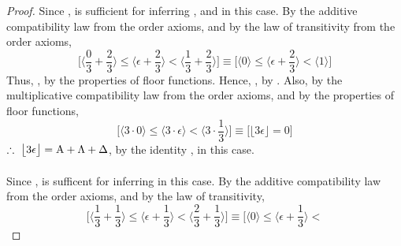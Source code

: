 \documentclass[preview]{standalone}
\begin{document}
\begin{proof}
    Since , 
    \bm{$\Delta$} is sufficient for inferring , 
    and \bm{$\Lambda$} in this case.
    By the additive compatibility law from the order axioms, 
    and by the law of transitivity from the order axioms,
    \begin{equation*}
        \bigg[
            \bigg \langle \frac{0}{3} + \frac{2}{3} \bigg \rangle
                \leq 
            \bigg \langle \epsilon + \frac{2}{3} \bigg \rangle 
                < 
            \bigg \langle \frac{1}{3} + \frac{2}{3} \bigg \rangle
        \bigg]
            \equiv
        \bigg[
            \bigg \langle 0 \bigg \rangle
                \leq 
            \bigg \langle \epsilon + \frac{2}{3} \bigg \rangle 
                < 
            \bigg \langle 1 \bigg \rangle
        \bigg]
    \end{equation*}
    Thus, , by the properties of floor functions. 
    Hence, , by . 
    Also, by the multiplicative compatibility law from the order axioms,
    and by the properties of floor functions,
    \begin{equation*}
        \bigg[
            \bigg \langle 3 \cdot 0 \bigg \rangle
                \leq
            \bigg \langle 3 \cdot \epsilon \bigg \rangle
                <
            \bigg \langle 3 \cdot \frac{1}{3} \bigg \rangle
        \bigg]
            \equiv
        \bigg[
            \big \lfloor 3 \epsilon \big \rfloor
                =
            0
        \bigg]
    \end{equation*}
    $\therefore \text{\space} \relax{
        \big \lfloor 3 \epsilon \big \rfloor
            =
        \mathrm{A} + \Lambda + \Delta
    }$, by the identity , in this case.
    \\ \\
    Since , \bm{$\Lambda$} is sufficent for inferring  in this case.
    By the additive compatibility law from the order axioms,
    and by the law of transitivity,
    \begin{equation*}
        \bigg[
            \bigg \langle \frac{1}{3} + \frac{1}{3} \bigg \rangle
                \leq 
            \bigg \langle \epsilon + \frac{1}{3} \bigg \rangle 
                < 
            \bigg \langle \frac{2}{3} + \frac{1}{3} \bigg \rangle
        \bigg]
            \equiv
        \bigg[
            \bigg \langle 0 \bigg \rangle
                \leq 
            \bigg \langle \epsilon + \frac{1}{3} \bigg \rangle 
                < 

\end{equation*}
\end{proof}
\end{document}
